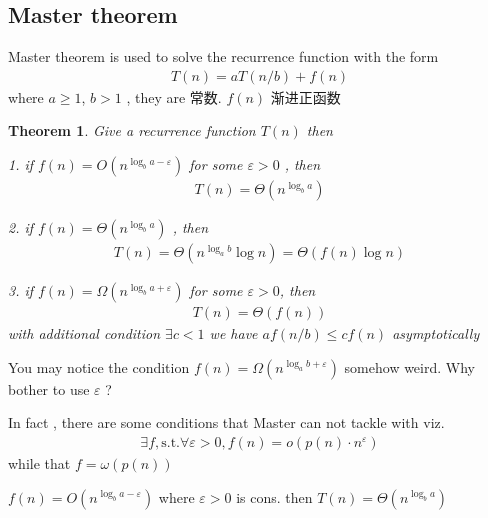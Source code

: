 \documentclass[a4paper, 10pt]{ctexart} %
\newtheorem{theorem}{Theorem}
\begin{document}
\subsection{Master theorem}
Master theorem is used to solve the recurrence function with the form 
\begin{align*}
    T \left(n\right) =  a T\left( n  / b\right) + f \left(n\right)
\end{align*}
where $a \ge 1$,  $b >1$ , they are 常数. $f \left(n\right)$ 渐进正函数

\begin{theorem}
    Give a recurrence function $T\left(n\right)$ then

    1. if $f\left(n\right) = O \left( n ^{\log _{b} a - \varepsilon}\right)$ for some $\varepsilon > 0$ , then 
    \begin{align*}
        T\left(n\right) = \Theta \left(n ^{\log _{b}a}\right)
    \end{align*}

    2. if $f \left(n\right) = \Theta \left(n ^{\log _{b} a}\right)$ , then 
    \begin{align*}
    T\left(n\right) = \Theta \left( n ^{\log _{a }b } \log  n\right) = \Theta \left(f \left(n\right) \log n    \right)
    \end{align*}

    3. if $f \left(n \right) = \Omega \left( n ^{\log _{b} a + \varepsilon}\right)$ for some $\varepsilon > 0$, then 
    \begin{align*}
        T\left(n\right) = \Theta \left(f \left(n\right)\right)
    \end{align*}
    with additional condition $\exists c < 1$ we have $a f \left( n  / b    \right) \le cf\left(n\right)$ asymptotically
\end{theorem}

You may notice the condition $f \left(n \right) = \Omega \left( n^{\log _{a} b + \varepsilon}\right)$ 
somehow weird. Why bother to use $\varepsilon$ ? 

In fact , there are some conditions that Master can not tackle with viz. 
\begin{align*}
    \exists f, \text{s.t.} \forall  \varepsilon > 0 , f\left(n\right) = o \left( p \left(n\right) \cdot  n ^{\varepsilon}\right)
\end{align*}
while that $f = \omega \left(p \left(n\right)\right)$

    $f\left(n\right) = O \left( n  ^{ \log _{b} a  - \varepsilon }\right)$  where $\varepsilon > 0$ is cons. then 
    $T\left(n\right)  =  \Theta \left(  n^{\log _{b}a   }\right)$
\end{document}

